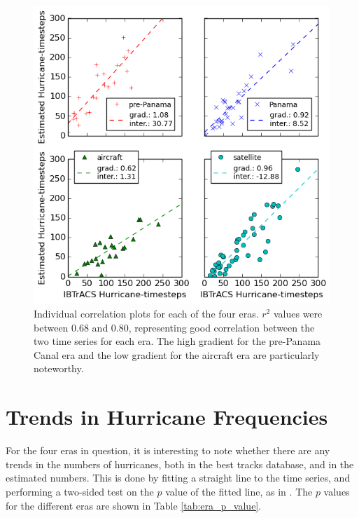 \documentclass[pdftex,12pt,a4paper]{report}
\begin{document}
\begin{figure}[ht!]
    \centering
    \includegraphics[width=\textwidth]{figures/20th_century_corr_split}
    \caption{Individual correlation plots for each of the four eras. $r^2$ values were between 0.68
    and 0.80, representing good correlation between the two time series for each era. The high
    gradient for the pre-Panama Canal era and the low gradient for the aircraft era are particularly
    noteworthy. }
    \label{fig:20th_century_hurricane_corr_split}
\end{figure}

\newpage
\section{Trends in Hurricane Frequencies}
\label{sec:trends_freq}

For the four eras in question, it is interesting to note whether there are any trends in the numbers
of hurricanes, both in the best tracks database, and in the estimated numbers. This is done by
fitting a straight line to the time series, and performing a two-sided test on the $p$ value of the
fitted line, as in \textcite{vecchi2008estimates, emanuel2010tropical}. The $p$ values for the
different eras are shown in Table \ref{tab:era_p_value}.
\end{document}
